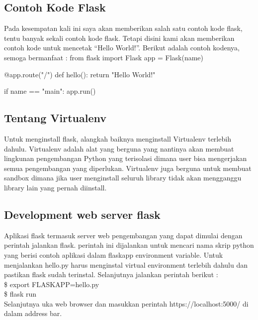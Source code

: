 \documentclass[12pt,a4paper]{article}
\begin{document}
\subsection{Contoh Kode Flask}
Pada kesempatan kali ini saya akan memberikan salah satu contoh kode flask, tentu banyak sekali contoh kode flask. Tetapi disini kami akan memberikan contoh kode untuk mencetak “Hello World!”. Berikut adalah contoh kodenya, semoga bermanfaat :
from flask import Flask
app = Flask(name)

@app.route("/")
def hello():
    return "Hello World!"

if name == "main":
    app.run()
\subsection{Tentang Virtualenv}
Untuk menginstall flask, alangkah baiknya menginstall Virtualenv terlebih dahulu. Virtualenv adalah alat yang berguna yang nantinya akan membuat lingkunan pengembangan Python yang terisolasi dimana user bisa mengerjakan semua pengembangan yang diperlukan. Virtualenv juga berguna untuk membuat sandbox dimana jika user menginstall seluruh library tidak akan mengganggu library lain yang pernah diinstall.
\subsection{Development web server flask}
Aplikasi flask termasuk server web pengembangan yang dapat dimulai dengan perintah jalankan flask. perintah ini dijalankan  untuk mencari nama skrip python yang berisi contoh aplikasi dalam flaskapp environment variable.
Untuk menjalankan hello.py harus menginstal virtual environment terlebih dahulu dan pastikan flask sudah terinstal. Selanjutnya jalankan perintah berikut :\\
\$ export FLASKAPP=hello.py\\
\$ flask run\\
Selanjutnya uka web browser dan masukkan perintah https://localhost:5000/ di dalam address bar.
\end{document}
